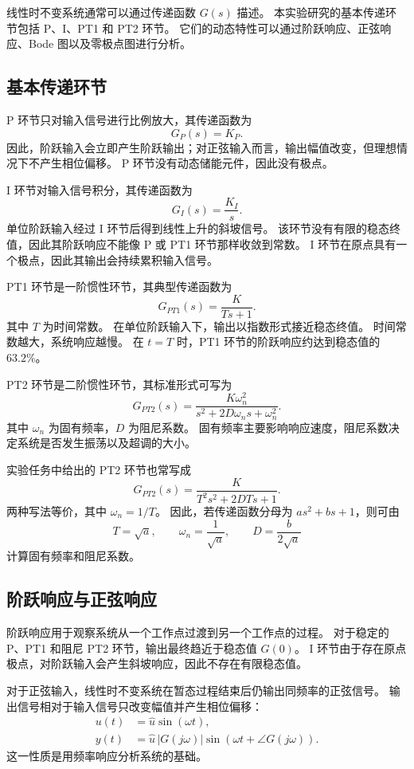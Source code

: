 线性时不变系统通常可以通过传递函数 $G(s)$ 描述。
本实验研究的基本传递环节包括 P、I、PT1 和 PT2 环节。
它们的动态特性可以通过阶跃响应、正弦响应、Bode 图以及零极点图进行分析。

\subsection{基本传递环节}

P 环节只对输入信号进行比例放大，其传递函数为
\[
  G_P(s) = K_P .
\]
因此，阶跃输入会立即产生阶跃输出；对正弦输入而言，输出幅值改变，但理想情况下不产生相位偏移。
P 环节没有动态储能元件，因此没有极点。

I 环节对输入信号积分，其传递函数为
\[
  G_I(s) = \frac{K_I}{s}.
\]
单位阶跃输入经过 I 环节后得到线性上升的斜坡信号。
该环节没有有限的稳态终值，因此其阶跃响应不能像 P 或 PT1 环节那样收敛到常数。
I 环节在原点具有一个极点，因此其输出会持续累积输入信号。

PT1 环节是一阶惯性环节，其典型传递函数为
\[
  G_{PT1}(s) = \frac{K}{T s + 1}.
\]
其中 $T$ 为时间常数。
在单位阶跃输入下，输出以指数形式接近稳态终值。
时间常数越大，系统响应越慢。
在 $t=T$ 时，PT1 环节的阶跃响应约达到稳态值的 $63.2\%$。

PT2 环节是二阶惯性环节，其标准形式可写为
\[
  G_{PT2}(s) =
  \frac{K \omega_n^2}{s^2 + 2D\omega_n s + \omega_n^2}.
\]
其中 $\omega_n$ 为固有频率，$D$ 为阻尼系数。
固有频率主要影响响应速度，阻尼系数决定系统是否发生振荡以及超调的大小。

实验任务中给出的 PT2 环节也常写成
\[
  G_{PT2}(s) = \frac{K}{T^2s^2 + 2DTs + 1}.
\]
两种写法等价，其中 $\omega_n = 1/T$。
因此，若传递函数分母为 $a s^2 + b s + 1$，则可由
\[
  T = \sqrt{a}, \qquad
  \omega_n = \frac{1}{\sqrt{a}}, \qquad
  D = \frac{b}{2\sqrt{a}}
\]
计算固有频率和阻尼系数。

\subsection{阶跃响应与正弦响应}

阶跃响应用于观察系统从一个工作点过渡到另一个工作点的过程。
对于稳定的 P、PT1 和阻尼 PT2 环节，输出最终趋近于稳态值 $G(0)$。
I 环节由于存在原点极点，对阶跃输入会产生斜坡响应，因此不存在有限稳态值。

对于正弦输入，线性时不变系统在暂态过程结束后仍输出同频率的正弦信号。
输出信号相对于输入信号只改变幅值并产生相位偏移：
\begin{align*}
  u(t) &= \hat{u}\sin(\omega t),\\
  y(t) &= \hat{u}\,|G(j\omega)|
          \sin\!\left(\omega t + \angle G(j\omega)\right).
\end{align*}
这一性质是用频率响应分析系统的基础。


